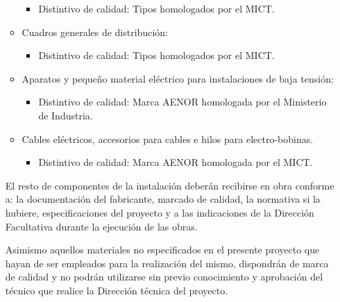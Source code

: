 \documentclass[../main.tex]{subfiles}
\begin{document}
\begin{itemize}
\begin{itemize}
\begin{itemize}
            \item Distintivo de calidad: Tipos homologados por el MICT.
        \end{itemize}
        \item Cuadros generales de distribución:
        \begin{itemize}
            \item Distintivo de calidad: Tipos homologados por el MICT.
        \end{itemize}
        \item Aparatos y pequeño material eléctrico para instalaciones de baja tensión:
        \begin{itemize}
            \item Distintivo de calidad: Marca AENOR homologada por el Ministerio de Industria.
        \end{itemize}
        \item Cables eléctricos, accesorios para cables e hilos para electro-bobinas.
        \begin{itemize}
            \item Distintivo de calidad: Marca AENOR homologada por el MICT.
        \end{itemize}
    \end{itemize}
    El resto de componentes de la instalación deberán recibirse en obra conforme a: la documentación del fabricante, marcado de calidad, la normativa si la hubiere, especificaciones del proyecto y a las indicaciones de la Dirección Facultativa durante la ejecución de las obras. \par
    \vspace{0.5 cm}
    Asimismo aquellos materiales no especificados en el presente proyecto que hayan de ser empleados para la realización del mismo, dispondrán de marca de calidad y no podrán utilizarse sin previo conocimiento y aprobación del técnico que realice la Dirección técnica del proyecto.
\end{itemize}
\end{document}
